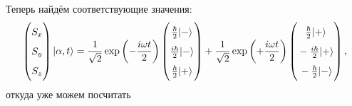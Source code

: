 Теперь найдём соответствующие значения:
\begin{align*}
    \begin{pmatrix}
         S_x \vphantom{\dfrac{1}{2}} \\ 
         \vphantom{\dfrac{1}{2}} S_y \\ 
         \vphantom{\dfrac{1}{2}} S_z
     \end{pmatrix} | \alpha,t\rangle =  \frac{1}{\sqrt{2}} \exp \left(- \frac{i \omega t}{2}\right) \begin{pmatrix}
            \textstyle \frac{\hbar}{2} | -\rangle   
            \vphantom{\dfrac{1}{2}}\\
            \textstyle \frac{i\hbar}{2} | -\rangle  
            \vphantom{\dfrac{1}{2}}\\
            \textstyle \frac{\hbar}{2} | +\rangle  
            \vphantom{\dfrac{1}{2}}
     \end{pmatrix}
     + \frac{1}{\sqrt{2}} \exp\left(+\frac{i \omega t}{2}\right)
     \begin{pmatrix}
            \vphantom{\dfrac{1}{2}} 
            \textstyle \frac{\hbar}{2} | +\rangle  \\
            \vphantom{\dfrac{1}{2}} 
            \textstyle -\frac{i\hbar}{2} | +\rangle \\
            \vphantom{\dfrac{1}{2}} 
            \textstyle -\frac{\hbar}{2} | -\rangle 
     \end{pmatrix},
\end{align*}
откуда уже можем посчитать
